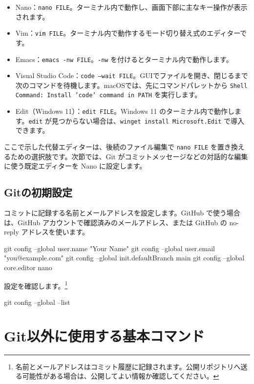 \documentclass[a4paper,11pt]{jlreq}
\newcommand{\cmd}[1]{\texttt{#1}}
\begin{document}
\begin{itemize}
  \item Nano：\cmd{nano FILE}。ターミナル内で動作し、画面下部に主なキー操作が表示されます。
  \item Vim：\cmd{vim FILE}。ターミナル内で動作するモード切り替え式のエディターです\cite{vim-download}。
  \item Emacs：\cmd{emacs -nw FILE}。\cmd{-nw} を付けるとターミナル内で動作します\cite{emacs-download}。
  \item Visual Studio Code：\cmd{code --wait FILE}。GUIでファイルを開き、閉じるまで次のコマンドを待機します。macOSでは、先にコマンドパレットから \cmd{Shell Command: Install 'code' command in PATH} を実行します\cite{vscode-cli}。
  \item Edit（Windows 11）：\cmd{edit FILE}。Windows 11 のターミナル内で動作します。\cmd{edit} が見つからない場合は、\cmd{winget install Microsoft.Edit} で導入できます\cite{windows-edit}。
\end{itemize}

ここで示した代替エディターは、後続のファイル編集で \cmd{nano FILE} を置き換えるための選択肢です。次節では、Git がコミットメッセージなどの対話的な編集に使う既定エディターを Nano に設定します。

\subsection{Gitの初期設定}

コミットに記録する名前とメールアドレスを設定します。GitHub で使う場合は、GitHub アカウントで確認済みのメールアドレス、または GitHub の no-reply アドレスを使います。

\begin{codeblock}
git config --global user.name "Your Name"
git config --global user.email "you@example.com"
git config --global init.defaultBranch main
git config --global core.editor nano
\end{codeblock}

設定を確認します。\footnote{名前とメールアドレスはコミット履歴に記録されます。公開リポジトリへ送る可能性がある場合は、公開してよい情報か確認してください。}

\begin{codeblock}
git config --global --list
\end{codeblock}

\section{Git以外に使用する基本コマンド}
\end{document}
